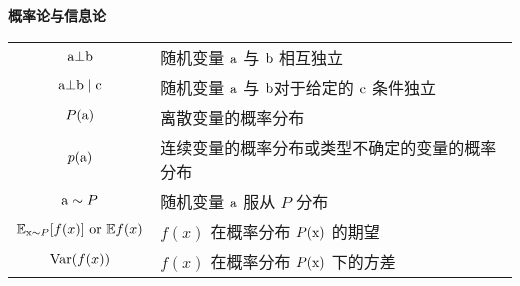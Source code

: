 \vspace{\notationgap}
\begin{minipage}{\textwidth}
\centerline{\bf 概率论与信息论}
\bgroup
\def\arraystretch{1.5}
\begin{tabular}{cp{3.25in}}
$\displaystyle {\textnormal{a}} \bot {\textnormal{b}}$ & 随机变量 ${\textnormal{a}}$ 与 ${\textnormal{b}}$ 相互独立\\
$\displaystyle {\textnormal{a}} \bot {\textnormal{b}} \mid {\textnormal{c}} $ & 随机变量 ${\textnormal{a}}$ 与 ${\textnormal{b}}$对于给定的 ${\textnormal{c}}$ 条件独立\\
$\displaystyle P({\textnormal{a}})$ & 离散变量的概率分布\\
$\displaystyle p({\textnormal{a}})$ & 连续变量的概率分布或类型不确定的变量的概率分布 \\
$\displaystyle {\textnormal{a}} \sim P$ & 随机变量 ${\textnormal{a}}$ 服从 $P$ 分布\\%
$\displaystyle  \mathbb{E}_{{\textnormal{x}}\sim P} [ f(x) ]\text{ or } \mathbb{E} f(x)$ & $f(x)$ 在概率分布 $P({\textnormal{x}})$ 的期望\\
$\displaystyle \mathrm{Var}(f(x)) $ & $f(x)$ 在概率分布 $P({\textnormal{x}})$ 下的方差\\

\end{tabular}
\end{minipage}
